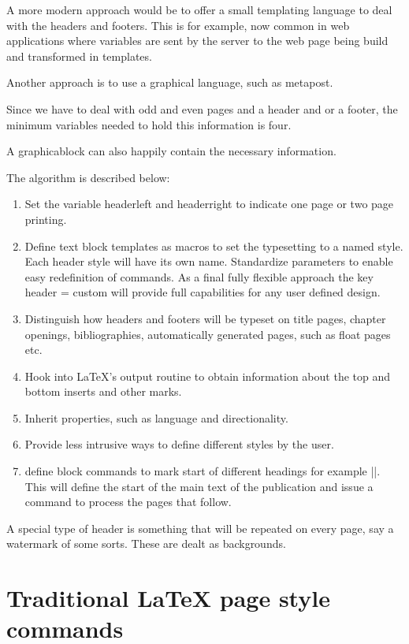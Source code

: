 A more modern approach would be to offer a small templating language to deal with the headers and footers. This is for example, now common in web applications where variables are sent by the server to the web page being build and transformed in templates.

Another approach is to use a graphical language, such as metapost.

Since we have to deal with odd and even pages and a header and or a footer, the minimum variables needed to hold this information is four. 

A graphicablock can also happily contain the necessary information.

The algorithm is described below:

\begin{enumerate}
\item Set the variable headerleft and headerright to indicate one page or two page printing.
\item Define text block templates as macros to set the typesetting to a named style. Each header style
         will have its own name. Standardize parameters to enable easy redefinition of commands. As a 
         final fully flexible approach the key header = custom will provide full capabilities for any user
         defined design.
\item Distinguish how headers and footers will be typeset on title pages, chapter openings, bibliographies, 
         automatically generated pages, such as float pages etc.
\item Hook into LaTeX’s output routine to obtain information about the top and bottom inserts and other marks.         
\item Inherit properties, such as language and directionality.
\item Provide less intrusive ways to define different styles by the user.
\item define block commands to mark start of different headings for example |\mainmatter|. This will define
         the start of the main text of the publication and issue a command to process the pages that follow.
\end{enumerate}

A special type of header is something that will be repeated on every page, say a watermark of some sorts. These are dealt as backgrounds.
 
\section{Traditional LaTeX page style commands}
  
